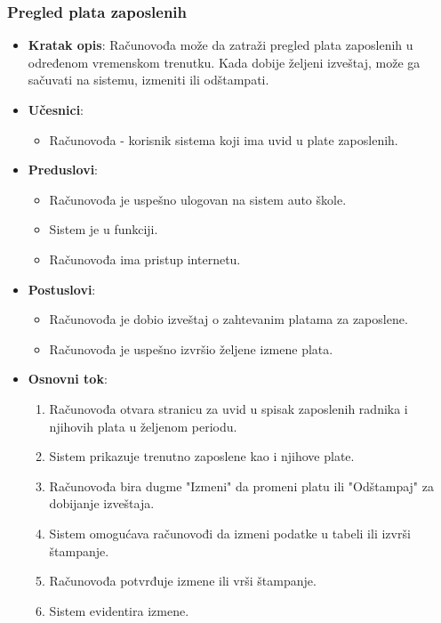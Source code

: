 \subsubsection{Pregled plata zaposlenih}
\label{subsubsec:vozni park}
\begin{itemize}
  \item \textbf{Kratak opis}: Računovođa može da zatraži pregled plata zaposlenih u određenom vremenskom trenutku. 
  Kada dobije željeni izveštaj, može ga sačuvati na sistemu, izmeniti ili odštampati.

  \item \textbf{Učesnici}:
    \begin{itemize}
    \item Računovođa - korisnik sistema koji ima uvid u plate zaposlenih. 
    \end{itemize}
  \item \textbf{Preduslovi}:
    \begin{itemize}
    \item  Računovođa je uspešno ulogovan na sistem auto škole.
    \item  Sistem je u funkciji.
    \item  Računovođa ima pristup internetu.
    \end{itemize}
  \item \textbf{Postuslovi}:
      \begin{itemize}
      \item  Računovođa je dobio izveštaj o zahtevanim platama za zaposlene.
      \item  Računovođa je uspešno izvršio željene izmene plata.
      \end{itemize}
  \item \textbf{Osnovni tok}:
      \begin{enumerate}
        \item Računovođa otvara stranicu za uvid u spisak zaposlenih radnika i njihovih plata u željenom periodu.
        \item Sistem prikazuje trenutno zaposlene kao i njihove plate.
        \item Računovođa bira dugme "Izmeni" da promeni platu ili  "Odštampaj" za dobijanje izveštaja.
        \item Sistem omogućava računovođi da izmeni podatke u tabeli  ili  izvrši štampanje.
        \item Računovođa potvrđuje izmene ili vrši štampanje.
        \item Sistem evidentira izmene.
      \end{enumerate}


\end{itemize}
